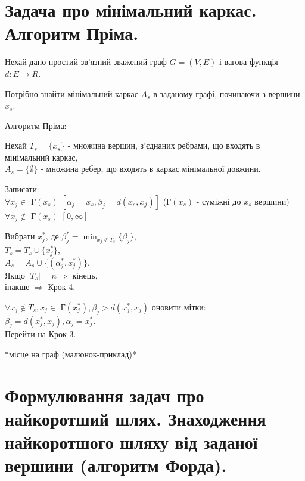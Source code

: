 \documentclass[12pt,a4paper]{report}
\newenvironment{slim_enumerate}{
\begin{enumerate}
  \setlength{\itemsep}{1pt}
  \setlength{\parskip}{0pt}
  \setlength{\parsep}{0pt}}
{\end{enumerate}}
\begin{document}

\pagestyle{empty}

\tableofcontents
\clearpage

\fontsize{14pt}{6mm}\selectfont

\chapter{Задача про мінімальний каркас. Алгоритм Пріма.}

Нехай дано простий зв’язний зважений граф $G=(V,E)$ і вагова функція $d:E\rightarrow R$.

Потрібно знайти мінімальний каркас $A_s$ в заданому графі, починаючи з вершини $x_s$.

Алгоритм Пріма:
\begin{slim_enumerate}
  \item Нехай $T_s = \{x_s\}$ - множина вершин, з’єднаних ребрами, що входять в мінімальний каркас,\\
$A_s = \{\emptyset\}$ - множина ребер, що входять в каркас мінімальної довжини.
  \item Записати:\\
$\forall x_j\in$ Г$(x_s)$ $[\alpha_j=x_s, \beta_j=d(x_s,x_j)]$ (Г$(x_s)$ - суміжні до $x_s$ вершини)\\
$\forall x_j\notin$ Г$(x_s)$ $[0,\infty]$
  \item Вибрати $x_j^*$, де $\beta_j^*=\displaystyle\min_{x_j\notin T_s}\{\beta_j\}$,\\
$T_s=T_s\cup\{x_j^*\}$,\\
$A_s=A_s\cup\{(\alpha_j^*,x_j^*)\}$.\\
Якщо $|T_s|=n\Rightarrow$ кінець,\\
інакше ${\Rightarrow}$ Крок 4.
  \item $\forall x_j\notin T_s, x_j\in$ Г$(x_j^*), \beta_j>d(x_j^*,x_j)$ оновити мітки:\\
$\beta_j=d(x_j^*,x_j), \alpha_j=x_j^*$.\\
Перейти на Крок 3.
\end{slim_enumerate}

*місце на граф (малюнок-приклад)*

\clearpage

\chapter{Формулювання задач про найкоротший шлях. Знаходження найкоротшого шляху від заданої вершини (алгоритм Форда).}
\end{document}
